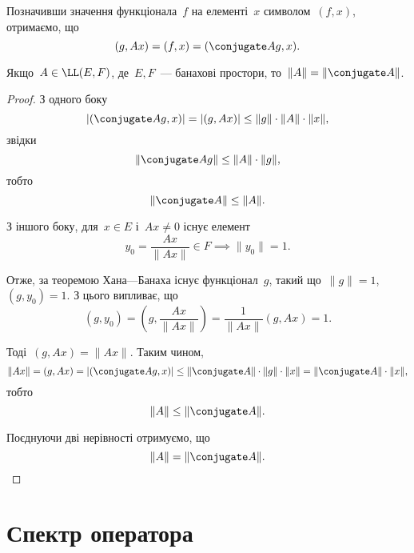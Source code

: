 Позначивши значення функціонала~$f$ на елементі~$x$
символом~$(f, x)$, отримаємо, що
\begin{equation*}
    (g, Ax) = (f, x) = (\conjugate A g, x).    
\end{equation*}

\begin{theorem}
Якщо~$A \in \LL(E, F)$, де~$E, F$~--- банахові
простори, то~$\|A\| = \|\conjugate A\|$.
\end{theorem}

\begin{proof}
З одного боку
\begin{equation*}
    |(\conjugate A g, x)| = |(g, A x)| \le \|g\| \cdot \|A\| \cdot \|x\|,
\end{equation*}
звідки
\begin{equation*}
    \|\conjugate A g\| \le \|A\| \cdot \|g\|,
\end{equation*}
тобто
\begin{equation*}
    \|\conjugate A\| \le \|A\|.
\end{equation*}

З іншого боку, для~$x \in E$ і~$Ax \ne 0$ існує елемент
\begin{equation*}
    y_0 = \frac{Ax}{\|Ax\|} \in F \implies \|y_0\| = 1.
\end{equation*}

Отже, за теоремою Хана---Банаха існує функціонал~$g$, такий
що~$\|g\| = 1$, $(g, y_0) = 1$. З цього випливає, що
\begin{equation*}
    (g, y_0) = \left( g, \frac{Ax}{\|Ax\|} \right) = \frac{1}{\|Ax\|} (g, Ax) = 1.
\end{equation*}

Тоді~$(g, Ax) = \|Ax\|$. Таким чином,
\begin{equation*}
    \|Ax\| = (g, Ax) = |(\conjugate A g, x)| \le \|\conjugate A\| \cdot \|g\| \cdot \|x\| = \|\conjugate A\| \cdot \|x\|,
\end{equation*}
тобто
\begin{equation*}
    \|A\| \le \|\conjugate A\|.
\end{equation*}

Поєднуючи дві нерівності отримуємо, що
\begin{equation*}
    \|A\| = \|\conjugate A\|. \qedhere
\end{equation*}
\end{proof}

\section{Спектр оператора}

